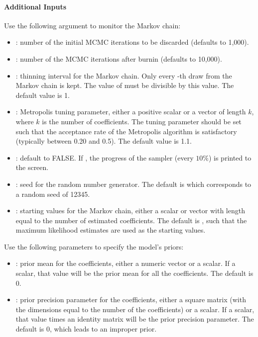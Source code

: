 \documentclass[letterpaper,10pt,english]{sphinxmanual}
\begin{document}
\paragraph{Additional Inputs}
\label{zelig-poissonbayes:additional-inputs}
Use the following argument to monitor the Markov chain:
\begin{itemize}
\item {} 
: number of the initial MCMC iterations to be discarded
(defaults to 1,000).

\item {} 
: number of the MCMC iterations after burnin (defaults to
10,000).

\item {} 
: thinning interval for the Markov chain. Only every
-th draw from the Markov chain is kept. The value of 
must be divisible by this value. The default value is 1.

\item {} 
: Metropolis tuning parameter, either a positive scalar or a
vector of length \(k\), where \(k\) is the number of
coefficients. The tuning parameter should be set such that the
acceptance rate of the Metropolis algorithm is satisfactory
(typically between 0.20 and 0.5). The default value is 1.1.

\item {} 
: default to FALSE. If , the progress of the
sampler (every \(10\%\)) is printed to the screen.

\item {} 
: seed for the random number generator. The default is 
which corresponds to a random seed of 12345.

\item {} 
: starting values for the Markov chain, either a scalar
or vector with length equal to the number of estimated coefficients.
The default is , such that the maximum likelihood estimates are
used as the starting values.

\end{itemize}

Use the following parameters to specify the model’s priors:
\begin{itemize}
\item {} 
: prior mean for the coefficients, either a numeric vector or a
scalar. If a scalar, that value will be the prior mean for all the
coefficients. The default is 0.

\item {} 
: prior precision parameter for the coefficients, either a
square matrix (with the dimensions equal to the number of the
coefficients) or a scalar. If a scalar, that value times an identity
matrix will be the prior precision parameter. The default is 0, which
leads to an improper prior.

\end{itemize}
\end{document}
